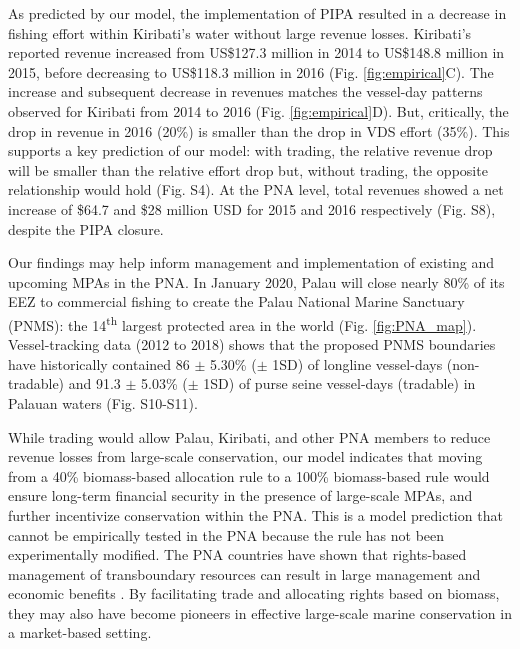 \documentclass[12pt]{article}
\begin{document}
As predicted by our model, the implementation of PIPA resulted in a decrease in fishing effort within Kiribati's water without large revenue losses. Kiribati's reported revenue increased from US\$127.3 million in 2014 to US\$148.8 million in 2015, before decreasing to US\$118.3 million in 2016 (Fig. \ref{fig:empirical}C). The increase and subsequent decrease in revenues matches the vessel-day patterns observed for Kiribati from 2014 to 2016 (Fig. \ref{fig:empirical}D). But, critically, the drop in revenue in 2016 (20\%) is smaller than the drop in VDS effort (35\%). This supports a key prediction of our model: with trading, the relative revenue drop will be smaller than the relative effort drop but, without trading, the opposite relationship would hold (Fig. S4). At the PNA level, total revenues showed a net increase of \$64.7 and \$28 million USD for 2015 and 2016 respectively (Fig. S8), despite the PIPA closure.

Our findings may help inform management and implementation of existing and upcoming MPAs in the PNA. In January 2020, Palau will close nearly 80\% of its EEZ to commercial fishing to create the Palau National Marine Sanctuary (PNMS): the 14\textsuperscript{th} largest protected area in the world (Fig. \ref{fig:PNA_map}). Vessel-tracking data (2012 to 2018) shows that the proposed PNMS boundaries have historically contained 86 $\pm$ 5.30\% ($\pm$ 1SD) of longline vessel-days (non-tradable) and 91.3 $\pm$ 5.03\% ($\pm$ 1SD) of purse seine vessel-days (tradable) in Palauan waters (Fig. S10-S11).

While trading would allow Palau, Kiribati, and other PNA members to reduce revenue losses from large-scale conservation, our model indicates that moving from a 40\% biomass-based allocation rule to a 100\% biomass-based rule would ensure long-term financial security in the presence of large-scale MPAs, and further incentivize conservation within the PNA. This is a model prediction that cannot be empirically tested in the PNA because the rule has not been experimentally modified. The PNA countries have shown that rights-based management of transboundary resources can result in large management and economic benefits \cite{havice_2013,aqorau_2018}. By facilitating trade and allocating rights based on biomass, they may also have become pioneers in effective large-scale marine conservation in a market-based setting.
\end{document}
